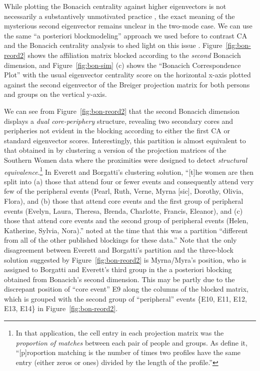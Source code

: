\documentclass[a4paper,fleqn]{cas-sc}
\begin{document}
While plotting the Bonacich centrality against higher eigenvectors is not necessarily a substantively unmotivated practice \citep[see][for discussion in the one-mode network case]{iacobucci2017eigenvector}, the exact meaning of the mysterious second eigenvector remains unclear in the two-mode case. We can use the same ``a posteriori blockmodeling'' approach we used before to contrast CA and the Bonacich centrality analysis to shed light on this issue \citep{wasserman1987stochastic}. Figure~\ref{fig:bon-reord2} shows the affiliation matrix blocked according to the \textit{second} Bonacich dimension, and Figure~\ref{fig:bon-sim} (c) shows the ``Bonacich Correspondence Plot'' with the usual eigenvector centrality score on the horizontal x-axis plotted against the second eigenvector of the Breiger projection matrix for both persons and groups on the vertical y-axis. 

We can see from Figure~\ref{fig:bon-reord2} that the second Bonacich dimension displays a \textit{dual core-periphery} structure, revealing two secondary cores and peripheries not evident in the blocking according to either the first CA or standard eigenvector scores. Interestingly, this partition is almost equivalent to that obtained in \citet[Table 5]{everett2013dual} by clustering a version of the projection matrices of the Southern Women data where the proximities were designed to detect \textit{structural equivalence}.\footnote{In that application, the cell entry in each projection matrix was the \textit{proportion of matches} between each pair of people and groups. As \citet[208]{everett2013dual} define it, ``[p]roportion matching is the number of times two profiles have the same entry (either zeros or ones) divided by the length of the profile.''} In Everett and Borgatti's \citeyearpar[208]{everett2013dual} clustering solution, ``[t]he women are then split into (a) those that attend four or fewer events and consequently attend very few of the peripheral events (Pearl, Ruth, Verne, Myrna [sic], Dorothy, Olivia, Flora), and (b) those that attend core events and the first group of peripheral events (Evelyn, Laura, Theresa, Brenda, Charlotte, Francis, Eleanor), and (c) those that attend core events and the second group of peripheral events (Helen, Katherine, Sylvia, Nora).'' \citet[208]{everett2013dual} noted at the time that this was a partition ``different from all of the other published blockings for these data.'' Note that the only disagreement between Everett and Borgatti's partition and the three-block solution suggested by Figure~\ref{fig:bon-reord2} is Myrna/Myra's position, who is assigned to Borgatti and Everett's third group in the a posteriori blocking obtained from Bonacich's second dimension. This may be partly due to the discrepant position of ``core event'' E9 along the columns of the blocked matrix, which is grouped with the second group of ``peripheral'' events \{E10, E11, E12, E13, E14\} in Figure~\ref{fig:bon-reord2}. 
\end{document}
